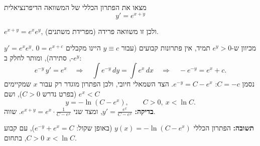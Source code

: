 
\begin{question}
מצאו את הפתרון הכללי של המשוואה הדיפרנציאלית
\[ y' = e^{x+y} \]
\end{question}

\begin{hint}
$e^{x+y} = e^x e^y$, ולכן זו משוואה פרידה (מפרידת משתנים).
\end{hint}

\begin{solution}
$y' = e^x e^y$. מכיוון ש-$e^y > 0$ תמיד, אין פתרונות קבועים (עבור $y\equiv c$ היינו מקבלים $0 = e^{x+c}$, סתירה), ומותר לחלק ב-$e^y$:
\[ e^{-y}\,y' = e^x \quad\Longrightarrow\quad \int e^{-y}\,dy = \int e^x\,dx \quad\Longrightarrow\quad -e^{-y} = e^x + c. \]
נסמן $C = -c$: $e^{-y} = C - e^x$. הצד השמאלי חיובי, ולכן הפתרון מוגדר רק עבור $x$ שמקיימים $e^x < C$ (בפרט נדרש $C > 0$), ושם
\[ y = -\ln\left(C - e^x\right), \qquad C > 0,\ x < \ln C. \]
\textbf{בדיקה:} $y' = \frac{e^x}{C - e^x}$, ומצד שני $e^{x+y} = e^x\cdot\frac{1}{C - e^x}$. שווה.

\textbf{תשובה:} הפתרון הכללי $y(x) = -\ln(C - e^x)$ (באופן שקול: $e^{-y} + e^x = C$), עם קבוע $C>0$, בתחום $x < \ln C$.
\end{solution}
